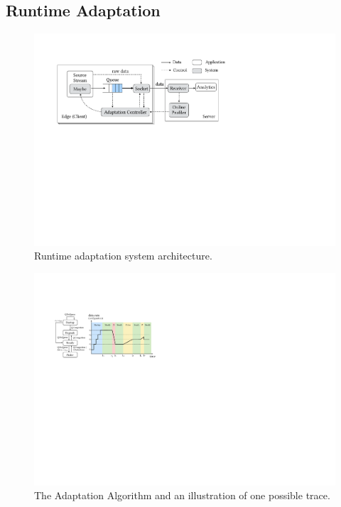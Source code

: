 \subsection{Runtime Adaptation}
\label{sec:runtime}

\begin{figure}
  \centering
  \includegraphics[width=\linewidth]{figures/runtime-adaptation.pdf}
  \caption{Runtime adaptation system architecture.}
  \label{fig:runtime}
\end{figure}

\begin{figure}
  \centering
  \includegraphics[width=\columnwidth]{figures/cc.pdf}
  \caption{The Adaptation Algorithm and an illustration of one possible trace.}
  \label{fig:cc}
\end{figure}

